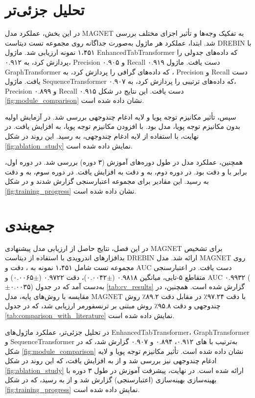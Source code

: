 \section{تحلیل جزئی‌تر}
در این بخش، عملکرد مدل MAGNET به تفکیک وجه‌ها و تأثیر اجزای مختلف بررسی شد. ابتدا، عملکرد هر ماژول به‌صورت جداگانه روی مجموعه تست دیتاست DREBIN \cite{Drebin} با ۱،۴۵۱ نمونه ارزیابی شد. ماژول EnhancedTabTransformer که داده‌های جدولی را پردازش کرد، به  ۰.۹۱۲، Precision ۰.۹۰۵ و Recall ۰.۹۱۹ دست یافت. ماژول GraphTransformer که داده‌های گرافی را پردازش کرد، به  ، Precision  و Recall  دست یافت. ماژول SequenceTransformer که داده‌های ترتیبی را پردازش کرد، به  ۰.۹۰۷، Precision ۰.۸۹۹ و Recall ۰.۹۱۵ دست یافت. این نتایج در شکل \ref{fig:module_comparison} نشان داده شده است.

سپس، تأثیر مکانیزم توجه پویا و لایه ادغام چندوجهی بررسی شد. در آزمایش اولیه بدون مکانیزم توجه پویا،  مدل  بود. با افزودن مکانیزم توجه پویا،  به  افزایش یافت. در نهایت، با استفاده از لایه ادغام چندوجهی،  به  رسید. این روند در شکل \ref{fig:ablation_study} نمایش داده شده است.

همچنین، عملکرد مدل در طول دوره‌های آموزش (۳ دوره) بررسی شد. در دوره اول،  برابر با  و دقت  بود. در دوره دوم،  به  و دقت به  افزایش یافت. در دوره سوم،  به  و دقت به  رسید. این مقادیر برای مجموعه اعتبارسنجی گزارش شدند و در شکل \ref{fig:training_progress} نشان داده شده است.

\section{جمع‌بندی}
در این فصل، نتایج حاصل از ارزیابی مدل پیشنهادی MAGNET برای تشخیص بدافزارهای اندرویدی با استفاده از دیتاست DREBIN \cite{Drebin} ارائه شد. مدل MAGNET روی مجموعه تست شامل ۱،۴۵۱ نمونه به  ، دقت  و AUC  دست یافت. در اعتبارسنجی متقاطع ۵-تایی، میانگین  ۰.۹۸۱۸ ($\pm$۰.۰۰۴۲)، دقت ۰.۹۷۲۲ ($\pm$۰.۰۰۶۵) و AUC ۰.۹۹۳۲ ($\pm$۰.۰۰۳۵) به‌دست آمد که در جدول \ref{tab:cv_results} گزارش شده است. همچنین، در مقایسه با روش‌های پایه، مدل MAGNET با دقت ۹۷.۲۴٪ در مقابل دقت ۸۹.۲٪ روش چندوجهی \cite{Alsaleh2023} و دقت ۹۵.۸٪ روش مبتنی بر ترنسفورمر \cite{TransformerMalware} ارزیابی شد، که در جدول \ref{tab:comparison_with_literature} نمایش داده شده است.

در تحلیل جزئی‌تر، عملکرد ماژول‌های EnhancedTabTransformer، GraphTransformer و SequenceTransformer به‌ترتیب با های ۰.۹۱۲، ۰.۸۹۴ و ۰.۹۰۷ گزارش شد، که در شکل \ref{fig:module_comparison} نشان داده شده است. تأثیر مکانیزم توجه پویا و لایه ادغام چندوجهی نیز بررسی شد و  از  به  افزایش یافت، که این روند در شکل \ref{fig:ablation_study} ارائه شده است. در نهایت، پیشرفت آموزش در طول ۳ دوره با بهینه‌سازی بهینه‌سازی (اعتبارسنجی) گزارش شد و  از  به  رسید، که در شکل \ref{fig:training_progress} نمایش داده شده است.

